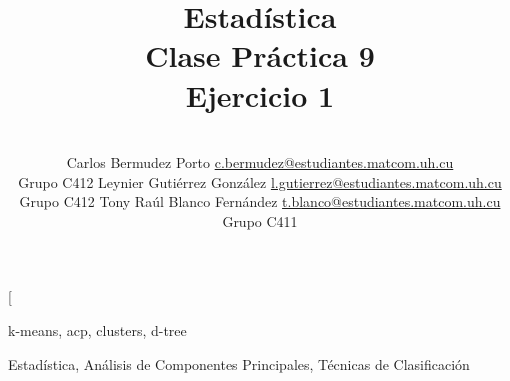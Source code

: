 \documentclass[a4paper,10pt,twocolumn]{article}
\title{Estadística\\Clase Práctica 9\\Ejercicio 1}
\author{\\
\name Carlos Bermudez Porto \email \href{mailto:c.bermudez@estudiantes.matcom.uh.cu}{c.bermudez@estudiantes.matcom.uh.cu}
	\\ \addr Grupo C412 \AND
\name Leynier Gutiérrez González \email \href{mailto:l.gutierrez@estudiantes.matcom.uh.cu}{l.gutierrez@estudiantes.matcom.uh.cu}
  \\ \addr Grupo C412 \AND
\name Tony Raúl Blanco Fernández \email \href{mailto:t.blanco@estudiantes.matcom.uh.cu}{t.blanco@estudiantes.matcom.uh.cu}
  \\ \addr Grupo C411}
\begin{document}
\twocolumn[

\maketitle









\begin{keywords}
	k-means,
	acp,
	clusters,
	d-tree
\end{keywords}

\begin{topics}
	Estadística, Análisis de Componentes Principales, Técnicas de Clasificación
\end{topics}
\end{document}
